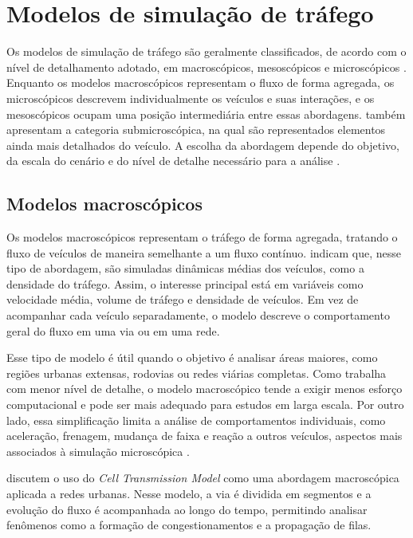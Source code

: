 \section{Modelos de simulação de tráfego}

Os modelos de simulação de tráfego são geralmente classificados, de acordo com o nível de detalhamento adotado, em macroscópicos, mesoscópicos e microscópicos \cite{dorokhin_2020}. Enquanto os modelos macroscópicos representam o fluxo de forma agregada, os microscópicos descrevem individualmente os veículos e suas interações, e os mesoscópicos ocupam uma posição intermediária entre essas abordagens.  também apresentam a categoria submicroscópica, na qual são representados elementos ainda mais detalhados do veículo. A escolha da abordagem depende do objetivo, da escala do cenário e do nível de detalhe necessário para a análise \cite{algherbal_2025}.

\subsection{Modelos macroscópicos}

Os modelos macroscópicos representam o tráfego de forma agregada, tratando o fluxo de veículos de maneira semelhante a um fluxo contínuo.  indicam que, nesse tipo de abordagem, são simuladas dinâmicas médias dos veículos, como a densidade do tráfego. Assim, o interesse principal está em variáveis como velocidade média, volume de tráfego e densidade de veículos. Em vez de acompanhar cada veículo separadamente, o modelo descreve o comportamento geral do fluxo em uma via ou em uma rede.

Esse tipo de modelo é útil quando o objetivo é analisar áreas maiores, como regiões urbanas extensas, rodovias ou redes viárias completas. Como trabalha com menor nível de detalhe, o modelo macroscópico tende a exigir menos esforço computacional e pode ser mais adequado para estudos em larga escala. Por outro lado, essa simplificação limita a análise de comportamentos individuais, como aceleração, frenagem, mudança de faixa e reação a outros veículos, aspectos mais associados à simulação microscópica \cite{lopez_2018}.

 discutem o uso do \textit{Cell Transmission Model} como uma abordagem macroscópica aplicada a redes urbanas. Nesse modelo, a via é dividida em segmentos e a evolução do fluxo é acompanhada ao longo do tempo, permitindo analisar fenômenos como a formação de congestionamentos e a propagação de filas.

